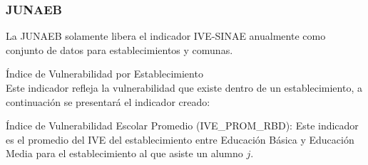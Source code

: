 \subsubsection{JUNAEB}
La JUNAEB solamente libera el indicador IVE-SINAE anualmente como conjunto de datos para establecimientos y comunas.
\begin{longdescription}
  \item[Índice de Vulnerabilidad por Establecimiento] \hfill \\
Este indicador refleja la vulnerabilidad que existe dentro de un establecimiento, a continuación se presentará el indicador creado:
    \begin{longdescription}
        \item[Índice de Vulnerabilidad Escolar Promedio](IVE\_PROM\_RBD): Este indicador es el promedio del IVE del establecimiento entre Educación Básica y Educación Media para el establecimiento al que asiste un alumno $j$.
    \end{longdescription}
\end{longdescription}